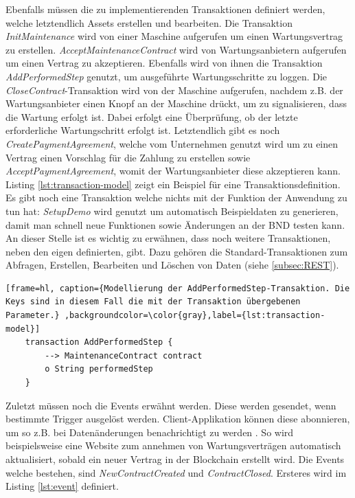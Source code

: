 Ebenfalls müssen die zu implementierenden Transaktionen definiert werden, welche letztendlich Assets erstellen und bearbeiten. Die Transaktion \textit{InitMaintenance} wird von einer Maschine aufgerufen um einen Wartungsvertrag zu erstellen. \textit{AcceptMaintenanceContract} wird von Wartungsanbietern aufgerufen um einen Vertrag zu akzeptieren. Ebenfalls wird von ihnen die Transaktion \textit{AddPerformedStep} genutzt, um ausgeführte Wartungsschritte zu loggen. Die \textit{CloseContract}-Transaktion wird von der Maschine aufgerufen, nachdem z.B. der Wartungsanbieter einen Knopf an der Maschine drückt, um zu signalisieren, dass die Wartung erfolgt ist. Dabei erfolgt eine Überprüfung, ob der letzte erforderliche Wartungschritt erfolgt ist. Letztendlich gibt es noch \textit{CreatePaymentAgreement}, welche vom Unternehmen genutzt wird um zu einen Vertrag einen Vorschlag für die Zahlung zu erstellen sowie \textit{AcceptPaymentAgreement}, womit der Wartungsanbieter diese akzeptieren kann. Listing \ref{lst:transaction-model} zeigt ein Beispiel für eine Transaktionsdefinition. Es gibt noch eine Transaktion welche nichts mit der Funktion der Anwendung zu tun hat: \textit{SetupDemo} wird genutzt um automatisch Beispieldaten zu generieren, damit man schnell neue Funktionen sowie Änderungen an der \acs{BND} testen kann. An dieser Stelle ist es wichtig zu erwähnen, dass noch weitere Transaktionen, neben den eigen definierten, gibt. Dazu gehören die Standard-Transaktionen zum Abfragen, Erstellen, Bearbeiten und Löschen von Daten (siehe \ref{subsec:REST}).

\begin{lstfloat}
    \begin{lstlisting}[frame=hl, caption={Modellierung der AddPerformedStep-Transaktion. Die Keys sind in diesem Fall die mit der Transaktion übergebenen Parameter.} ,backgroundcolor=\color{gray},label={lst:transaction-model}]
    transaction AddPerformedStep {
        --> MaintenanceContract contract
        o String performedStep
    }
    \end{lstlisting} 
\end{lstfloat}

Zuletzt müssen noch die Events erwähnt werden. Diese werden gesendet, wenn bestimmte Trigger ausgelöst werden. Client-Applikation können diese abonnieren, um so z.B. bei Datenänderungen benachrichtigt zu werden \cite{HyperledgerComposerTeamEmittingEventsHyperledger}. So wird beispielsweise eine Website zum annehmen von Wartungsverträgen automatisch aktualisiert, sobald ein neuer Vertrag in der Blockchain erstellt wird. Die Events welche bestehen, sind \textit{NewContractCreated} und \textit{ContractClosed}. Ersteres wird im Listing \ref{lst:event} definiert. 

